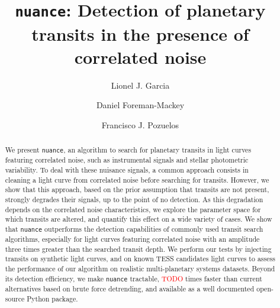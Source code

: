 \documentclass{aastex631}
\newcommand{\nuance}{\texttt{nuance}}
\newcommand{\TODO}{\textcolor{red}{TODO}}
\begin{document}
\title{\texttt{nuance}: Detection of planetary transits in the presence of correlated noise}

\author{Lionel J. Garcia}
\author{Daniel Foreman-Mackey}
\author{Francisco J. Pozuelos}


\begin{abstract}
    We present \nuance{}, an algorithm to search for planetary transits in light curves featuring correlated noise, such as instrumental signals and stellar photometric variability. To deal with these nuisance signals, a common approach consists in cleaning a light curve from correlated noise before searching for transits. However, we show that this approach, based on the prior assumption that transits are not present, strongly degrades their signals, up to the point of no detection. As this degradation depends on the correlated noise characteristics, we explore the parameter space for which transits are altered, and quantify this effect on a wide variety of cases. We show that \nuance{} outperforms the detection capabilities of commonly used transit search algorithms, especially for light curves featuring correlated noise with an amplitude three times greater than the searched transit depth. We perform our tests by injecting transits on synthetic light curves, and on known TESS candidates light curves to assess the performance of our algorithm on realistic multi-planetary systems datasets. Beyond its detection efficiency, we make \nuance{} tractable, \TODO{} times faster than current alternatives based on brute force detrending, and available as a well documented open-source Python package.
\end{abstract}

\end{document}
